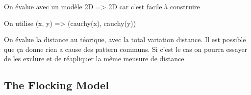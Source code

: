 \documentclass[10pt,letterpaper]{article}
\theoremstyle{definition}
\theoremstyle{remark}
\begin{document}
On évalue avec un modèle 2D => 2D car c'est facile à construire

On utilise (x, y) => (cauchy(x), cauchy(y))


On évalue la distance au téorique, avec la total variation distance. Il est possible que ça donne rien a cause des pattern communs. Si c'est le cas on pourra essayer de les exclure et de réapliquer la même meusure de distance.




\subsection*{The Flocking Model}



\cite{Reynolds1987}
\end{document}
